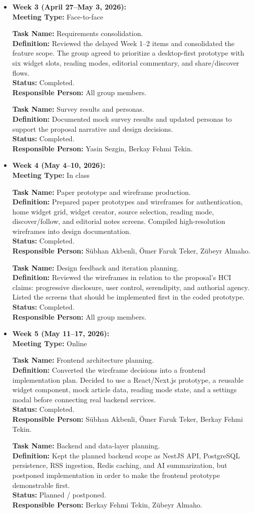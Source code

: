 \documentclass[12pt,a4paper]{article}
\newcommand{\taskentry}[4]{%
  \textbf{Task Name:} #1\\
  \textbf{Definition:} #2\\
  \textbf{Status:} #3\\
  \textbf{Responsible Person:} #4
}
\newcommand{\weekblock}[3]{%
  \item {\Large\bfseries #1}\\[-0.2em]
  \textbf{Meeting Type:} #2

  \vspace{0.25cm}
  \hspace*{0.8cm}
  \begin{minipage}[t]{0.86\textwidth}
    #3
  \end{minipage}
}
\begin{document}
\begin{itemize}[leftmargin=1.1cm, itemsep=1.45cm]
    \weekblock{Week 3 (April 27--May 3, 2026):}{Face-to-face}{
      \taskentry
        {Requirements consolidation.}
        {Reviewed the delayed Week 1--2 items and consolidated the feature scope. The group agreed to prioritize a desktop-first prototype with six widget slots, reading modes, editorial commentary, and share/discover flows.}
        {Completed.}
        {All group members.}

      \vspace{0.45cm}
      \taskentry
        {Survey results and personas.}
        {Documented mock survey results and updated personas to support the proposal narrative and design decisions.}
        {Completed.}
        {Yasin Sezgin, Berkay Fehmi Tekin.}
    }

    \weekblock{Week 4 (May 4--10, 2026):}{In class}{
      \taskentry
        {Paper prototype and wireframe production.}
        {Prepared paper prototypes and wireframes for authentication, home widget grid, widget creator, source selection, reading mode, discover/follow, and editorial notes screens. Compiled high-resolution wireframes into design documentation.}
        {Completed.}
        {Sübhan Akbenli, Ömer Faruk Teker, Zübeyr Almaho.}

      \vspace{0.45cm}
      \taskentry
        {Design feedback and iteration planning.}
        {Reviewed the wireframes in relation to the proposal's HCI claims: progressive disclosure, user control, serendipity, and authorial agency. Listed the screens that should be implemented first in the coded prototype.}
        {Completed.}
        {All group members.}
    }

    \clearpage
    \weekblock{Week 5 (May 11--17, 2026):}{Online}{
      \taskentry
        {Frontend architecture planning.}
        {Converted the wireframe decisions into a frontend implementation plan. Decided to use a React/Next.js prototype, a reusable widget component, mock article data, reading mode state, and a settings modal before connecting real backend services.}
        {Completed.}
        {Sübhan Akbenli, Ömer Faruk Teker, Berkay Fehmi Tekin.}

      \vspace{0.45cm}
      \taskentry
        {Backend and data-layer planning.}
        {Kept the planned backend scope as NestJS API, PostgreSQL persistence, RSS ingestion, Redis caching, and AI summarization, but postponed implementation in order to make the frontend prototype demonstrable first.}
        {Planned / postponed.}
        {Berkay Fehmi Tekin, Zübeyr Almaho.}
    }


\end{itemize}
\end{document}
